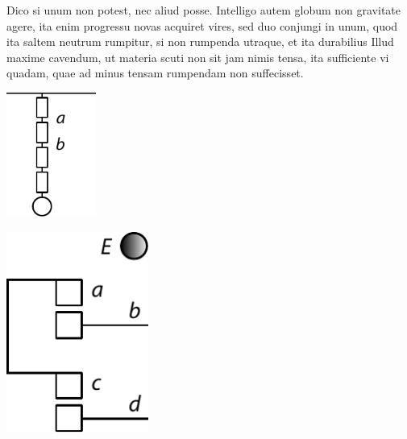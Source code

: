 Dico si unum non potest, nec aliud posse.
Intelligo autem globum\protect{}
non gravitate\protect{} agere,
ita enim progressu novas acquiret vires,\protect{}
sed
duo conjungi in unum,
quod ita saltem neutrum rumpitur,
si non rumpenda utraque,
et ita durabilius
Illud maxime cavendum,
ut materia scuti non sit jam nimis tensa,\protect{}
ita
sufficiente vi quadam,\protect{}
quae ad minus tensam rumpendam non suffecisset.
\pend%
\vspace{1.5em} 
\pstart 
\begin{minipage}[t]{0.5\textwidth}
\hspace{18mm}\includegraphics[width=0.22\textwidth]{gesamttex/edit_VIII,3/images/LH_35_09_15_020v_d6a.pdf}
\end{minipage}
\hspace{16mm}
\begin{minipage}[t]{0.5\textwidth}
\includegraphics[width=0.35\textwidth]{gesamttex/edit_VIII,3/images/LH_35_09_15_020v_d6b.pdf}
\end{minipage}
